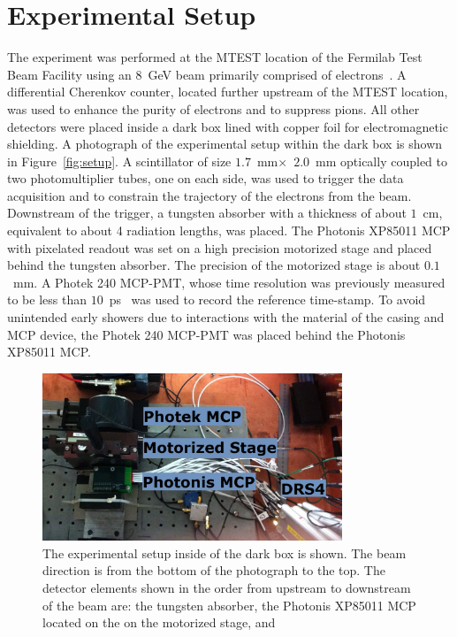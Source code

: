 \documentclass[12pt]{article}
\begin{document}
{\section{Experimental Setup}
The experiment was performed at the MTEST location of the Fermilab Test Beam
Facility using an $8$~GeV beam primarily comprised of electrons~\cite{FTBF}. A
differential Cherenkov counter, located further upstream of the MTEST location,
was used to enhance the purity of electrons and to suppress pions. All other
detectors were placed inside a dark box lined with copper foil for
electromagnetic shielding. A photograph of the experimental setup within the
dark box is shown in Figure~\ref{fig:setup}. A scintillator of size
$1.7$~mm$\times$~$2.0$~mm optically coupled to two photomultiplier tubes, one on
each side, was used to trigger the data acquisition and to constrain the
trajectory of the electrons from the beam. Downstream of the trigger, a tungsten
absorber with a thickness of about $1$~cm, equivalent to about 4 radiation
lengths, was placed. The Photonis XP85011 MCP with pixelated readout was set on
a high precision motorized stage and placed behind the tungsten absorber. The
precision of the motorized stage is about $0.1$~mm. A Photek 240 MCP-PMT, whose
time resolution was previously measured to be less than
$10$~ps~\cite{MCPShowerMaxPaper} was used to record the reference time-stamp. To
avoid unintended early showers due to interactions with the material of the
casing and MCP device, the Photek 240 MCP-PMT was placed behind the Photonis
XP85011 MCP.
\begin{figure}[htbp]
  \centering
  \includegraphics[width=0.8\textwidth]{Images/setup/setup.png}
  \caption{ The experimental setup inside of the dark box is shown. The beam
    direction is from the bottom of the photograph to the top. The detector elements
    shown in the order from upstream to downstream of the beam are: the tungsten
    absorber, the Photonis XP85011 MCP located on the on the motorized stage, and
}
\end{figure}}
\end{document}
